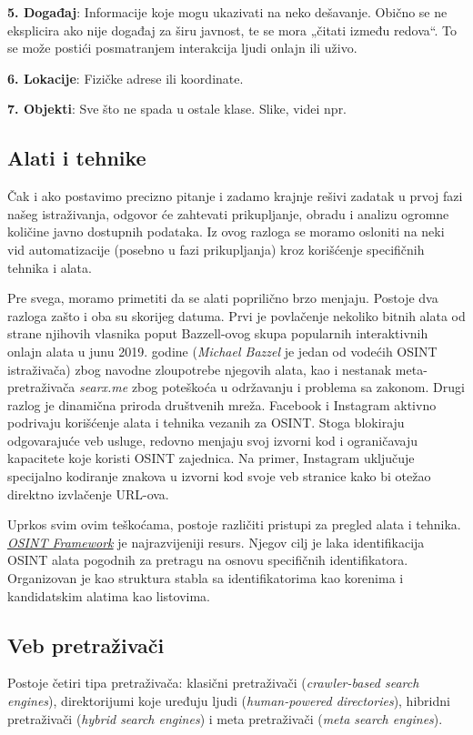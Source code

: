 \documentclass[fleqn, 12pt]{article}
\begin{document}
{\bf 5. Događaj}: Informacije koje mogu ukazivati na neko dešavanje. Obično se ne eksplicira ako nije događaj za širu javnost, te se mora „čitati između redova“. To se može postići posmatranjem interakcija ljudi onlajn ili uživo.\newline

{\bf 6. Lokacije}: Fizičke adrese ili koordinate.\newline

{\bf 7. Objekti}: Sve što ne spada u ostale klase. Slike, videi npr.
\subsection{Alati i tehnike}
Čak i ako postavimo precizno pitanje i zadamo krajnje rešivi zadatak u prvoj fazi našeg istraživanja, odgovor će zahtevati prikupljanje, obradu i analizu ogromne količine javno dostupnih podataka. Iz ovog razloga se moramo osloniti na neki vid automatizacije (posebno u fazi prikupljanja) kroz korišćenje specifičnih tehnika i alata.\newline

Pre svega, moramo primetiti da se alati poprilično brzo menjaju. Postoje dva razloga zašto i oba su skorijeg datuma. Prvi je povlačenje nekoliko bitnih alata od strane njihovih vlasnika poput Bazzell-ovog skupa popularnih interaktivnih onlajn alata u junu 2019. godine (\textit{Michael Bazzel} je jedan od vodećih OSINT istraživača) zbog navodne zloupotrebe njegovih alata, kao i nestanak meta-pretraživača \textit{searx.me} zbog poteškoća u održavanju i problema sa zakonom. Drugi razlog je dinamična priroda društvenih mreža. Facebook i Instagram aktivno podrivaju korišćenje alata i tehnika vezanih za OSINT. Stoga blokiraju odgovarajuće veb usluge, redovno menjaju svoj izvorni kod i ograničavaju kapacitete koje koristi OSINT zajednica. Na primer, Instagram uključuje specijalno kodiranje znakova u izvorni kod svoje veb stranice kako bi otežao direktno izvlačenje URL-ova.\newline

Uprkos svim ovim teškoćama, postoje različiti pristupi za pregled alata i tehnika. \textit{\href{https://osintframework.com/}{OSINT Framework}} je najrazvijeniji resurs. Njegov cilj je laka identifikacija OSINT alata pogodnih za pretragu na osnovu specifičnih identifikatora. Organizovan je kao struktura stabla sa identifikatorima kao korenima i kandidatskim alatima kao listovima.
\subsection{Veb pretraživači}
Postoje četiri tipa pretraživača: klasični pretraživači (\textit{crawler-based search engines}), direktorijumi koje uređuju ljudi (\textit{human-powered directories}), hibridni pretraživači (\textit{hybrid search engines}) i meta pretraživači (\textit{meta search engines}).\newline
\end{document}
